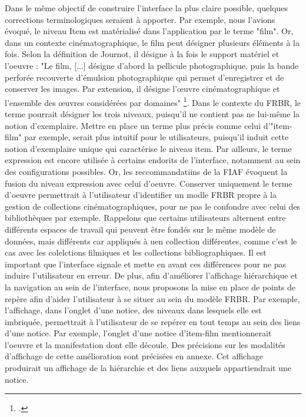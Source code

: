 Dans le même objectif de construire l'interface la plus claire possible, quelques corrections terminologiques seraient à apporter. Par exemple, nous l'avions évoqué, le niveau Item est matérialisé dans l'application par le terme "film". Or, dans un contexte cinématographique, le film peut désigner plusieurs éléments à la fois. Selon la définition de Journot, il désigne à la fois le support matériel et l'oeuvre : "Le film, [...] désigne d’abord la pellicule photographique, puis la bande perforée recouverte d’émulsion photographique qui permet d’enregistrer et de conserver les images. Par extension, il désigne l’œuvre cinématographique et l’ensemble des œuvres considérées par domaines" \footcite{journot2008}. Dans le contexte du FRBR, le terme pourrait désigner les trois niveaux, puisqu'il ne contient pas ne lui-même la notion d'exemplaire. Mettre en place un terme plus précis comme celui d'"item-film" par exemple, serait plus intuitif pour le utilisateurs, puisqu'il induit cette notion d'exemplaire unique qui caractérise le niveau item. Par ailleurs, le terme expression est encore utilisée à certains endorits de l'interface, notamment au sein des configurations possibles. Or, les reccommandatiins de la FIAF évoquent la fusion du niveau expression avec celui d'oeuvre. Conserver uniquement le terme d'oeuvre permettrait à l'utilisateur d'identifier un modle FRBR propre à la gestion de collections cinématographiques, pour ne pas le confondre avec celui des bibliothèques par exemple. Rappelons que certains utilisateurs alternent entre différents espaces de travail qui peuvent être fondés sur le même modèle de données, mais différents car appliqués à uen collection différentes, comme c'est le cas avec les colelctions filmiques et les collections bibliographiques. Il est important que l'interface signale et mette en avant ces différences pour ne pas induire l'utilisateur en erreur. 
De plus, afin d'améliorer l'affichage hiérarchique et la navigation au sein de l'interface, nous proposons la mise en place de points de repère afin d'aider l'utilisateur à se situer au sein du modèle FRBR. Par exemple, l'affichage, dans l'onglet d'une notice, des niveaux dans lesquels elle est imbriquée, permettrait à l'utilisateur de se repérer en tout temps au sein des liens d'une notice. Par exemple, l'onglet d'une notice d'item-film mentionnerait l'oeuvre et la manifestation dont elle découle. Des précisions sur les modalités d'affichage de cette amélioration sont précisées en annexe. Cet affichage produirait un affichage de la hiérarchie et des liens auxquels appartiendrait une notice.
